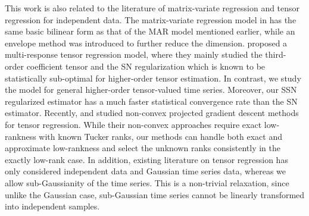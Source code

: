 \documentclass[12pt]{article}
\begin{document}
This work is also related to the literature of matrix-variate regression and tensor regression for independent data. The matrix-variate regression model in \cite{DingCook18} has the same basic bilinear form as that of the MAR model mentioned earlier, while an envelope method was introduced to further reduce the dimension.
\citet{raskutti2019convex} proposed a multi-response tensor regression model, where they mainly studied the third-order coefficient tensor and the SN regularization which is known to be statistically sub-optimal for higher-order tensor estimation. In contrast, we study the model for general higher-order tensor-valued time series. Moreover, our  SSN regularized estimator has a much faster statistical convergence rate than the SN estimator.  Recently,  \citet{chen2019non} and \citet{han2020optimal} studied non-convex projected gradient descent methods for tensor regression.  While their non-convex approaches require exact low-rankness  with known Tucker ranks, our methods can handle both exact and approximate low-rankness and select the unknown ranks consistently in the exactly low-rank case.
In addition, existing literature on tensor regression has only considered independent data and Gaussian time series data, whereas we allow sub-Gaussianity of the time series. This is a non-trivial relaxation, since unlike the Gaussian case,  sub-Gaussian time series cannot be linearly transformed into independent samples.
\end{document}
